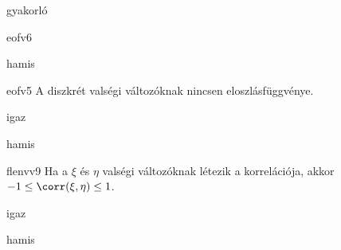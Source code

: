 \documentclass[12pt]{article}
\begin{document}
\begin{quiz}{gyakorló}
\begin{multi}[feedback={Az $F(x)=\P(\xi<x)$ konstans az $(a,b)$-n ha $a$ és $b$ két szomszédos eleme az értékkészletnek.}]{eofv6}
\item hamis
\end{multi}
\begin{multi}[feedback={Mindegyiknek van, definíció szerint.}]{eofv5}
A diszkrét valségi változóknak nincsen eloszlásfüggvénye.
\item igaz
\item* hamis
\end{multi}
\begin{multi}[feedback={Tulajdonság,tétel.}]{flenvv9}
Ha a $\xi$ és $\eta$ valségi változóknak létezik a korrelációja, akkor $-1\le \corr(\xi,\eta)\le 1$.
\item* igaz
\item hamis
\end{multi}
\end{quiz}
\end{document}
